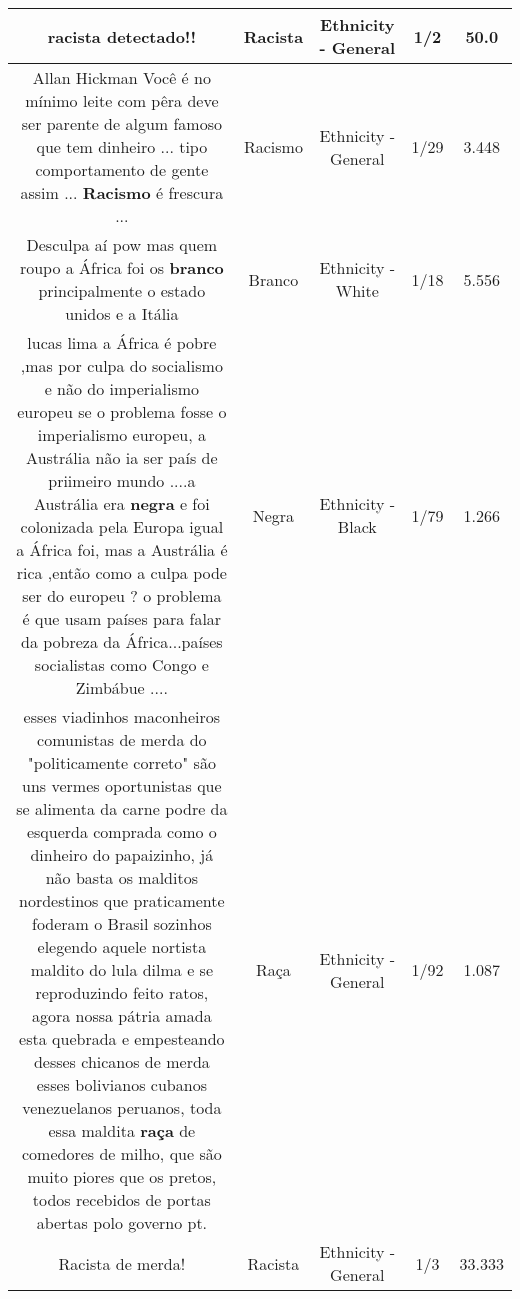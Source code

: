 \documentclass[11pt]{article}
\newlength\mylength
\begin{document}
\begin{center}
\begin{longtable}{|C{.65\mylength}|C{.30\mylength}|C{.12\mylength}|C{.12\mylength}|C{.12\mylength}|}
  \small racista detectado!!\normalsize   & Racista & Ethnicity - General & 1/2 & 50.0 \\  \hline
  \small Allan Hickman Você é no mínimo leite com pêra deve ser parente de algum famoso que tem dinheiro ... tipo comportamento de gente assim ... \textbf{Racismo} é frescura ...\normalsize   & Racismo & Ethnicity - General & 1/29 & 3.448 \\  \hline
  \small Desculpa aí pow mas quem roupo a África foi os \textbf{branco} principalmente o estado unidos e a Itália\normalsize   & Branco & Ethnicity - White & 1/18 & 5.556 \\  \hline
  \small lucas lima a África é pobre ,mas por culpa do socialismo e não do imperialismo europeu se o problema fosse o imperialismo europeu, a Austrália não ia ser país de priimeiro mundo ....a Austrália era \textbf{negra} e foi colonizada pela Europa igual a África foi, mas a Austrália é rica ,então como a culpa pode ser do europeu ? o problema é que usam países para falar da pobreza da África...países socialistas como Congo e Zimbábue ....\normalsize   & Negra & Ethnicity - Black & 1/79 & 1.266 \\  \hline
  \small esses viadinhos maconheiros comunistas de merda do "politicamente correto" são uns vermes oportunistas que se alimenta da carne podre da esquerda comprada como o dinheiro do papaizinho,  já não basta os malditos  nordestinos que praticamente foderam o Brasil sozinhos elegendo aquele nortista maldito do lula  dilma e se reproduzindo feito ratos, agora nossa pátria amada esta quebrada e empesteando desses chicanos de merda esses bolivianos cubanos venezuelanos peruanos, toda essa maldita \textbf{raça} de comedores de milho, que são muito piores que os pretos, todos recebidos de portas abertas polo governo pt.\normalsize   & Raça & Ethnicity - General & 1/92 & 1.087 \\  \hline
  \small Racista de merda!\normalsize   & Racista & Ethnicity - General & 1/3 & 33.333 \\  \hline

\end{longtable}
\end{center}
\end{document}
